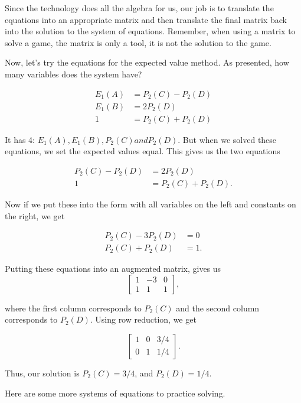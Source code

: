 Since the technology does all the algebra for us, our job is to translate the equations into an appropriate matrix and then translate the final matrix back into the solution to the system of equations. Remember, when using a matrix to solve a game, the matrix is only a tool, it is not the solution to the game.

Now, let's try the equations for the expected value method. As presented, how many variables does the system have?

\begin{align*}
E_1(A) &= P_2(C)-P_2(D)\\
E_1(B) &= 2P_2(D)\\
1 &= P_2(C)+P_2(D)
\end{align*}

It has 4: $E_1(A), E_1(B), P_2(C) and P_2(D)$. But when we solved these equations, we set the expected values equal. This gives us the two equations

\begin{align*}
P_2(C)-P_2(D) &= 2P_2(D)\\
1 &= P_2(C)+P_2(D).
\end{align*}

Now if we put these into the form with all variables on the left and constants on the right, we get 

\begin{align*}
P_2(C)-3P_2(D) &= 0\\
 P_2(C)+P_2(D) &= 1.
\end{align*}

Putting these equations into an augmented matrix, gives us
\[
\left[
\begin{matrix}
1 & -3 & 0\\
1 & 1 & 1
\end{matrix}
\right],
\]

where the first column corresponds to $P_2(C)$ and the second column corresponds to $P_2(D)$. Using row reduction, we get

\[
\left[
\begin{matrix}
1 & 0 & 3/4\\
0 & 1 & 1/4
\end{matrix}
\right].
\]

Thus, our solution is $P_2(C)=3/4$, and $P_2(D)=1/4$.

Here are some more systems of equations to practice solving.

